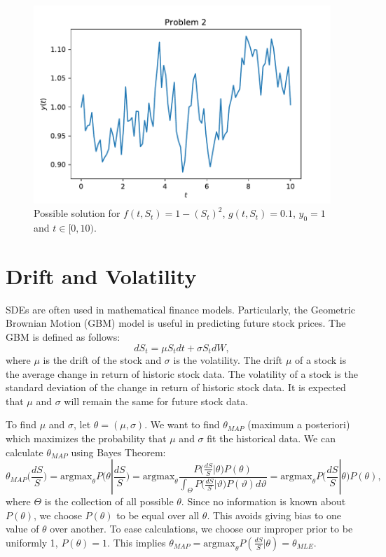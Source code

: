 \begin{figure}
\includegraphics[width=\textwidth]{figures/problem2.pdf}
\caption{Possible solution for $f(t,S_t)=1-(S_t)^2$, $g(t,S_t)=0.1$, $y_0=1$ and $t\in[0,10)$.}
\label{fig:prob2}
\end{figure}

\section*{Drift and Volatility}

SDEs are often used in mathematical finance models.
Particularly, the Geometric Brownian Motion (GBM) model is useful in predicting future stock prices.
The GBM is defined as follows:
\begin{equation}
dS_t=\mu S_tdt+\sigma S_tdW,
\label{eqn:gbm}
\end{equation}
where $\mu$ is the drift of the stock and $\sigma$ is the volatility.
The drift $\mu$ of a stock is the average change in return of historic stock data.
The volatility of a stock is the standard deviation of the change in return of historic stock data.
It is expected that $\mu$ and $\sigma$ will remain the same for future stock data.

To find $\mu$ and $\sigma$, let $\theta=(\mu,\sigma)$.
We want to find $\theta_{MAP}$ (maximum a posteriori) which maximizes the probability that $\mu$ and $\sigma$ fit the historical data.
We can calculate $\theta_{MAP}$ using Bayes Theorem:
\begin{equation}
\theta_{MAP}\Bigg(\frac{dS}{S}\Bigg)=\text{argmax}_\theta P\Bigg(\theta|\frac{dS}{S}\Bigg)=\text{argmax}_\theta\frac{P\Big(\frac{dS}{S}|\theta\Big)P(\theta)}{\int_\Theta P\Big(\frac{dS}{S}|\vartheta\Big)P(\vartheta)d\vartheta}=\text{argmax}_\theta P\Big(\frac{dS}{S}|\theta\Big)P(\theta),
\label{eqn:map}
\end{equation}
where $\Theta$ is the collection of all possible $\theta$.
Since no information is known about $P(\theta)$, we choose $P(\theta)$ to be equal over all $\theta$.
This avoids giving bias to one value of $\theta$ over another.
To ease calculations, we choose our improper prior to be uniformly 1, $P(\theta)=1$.
This implies $\theta_{MAP}=\text{argmax}_\theta P(\frac{dS}{S}|\theta)=\theta_{MLE}$.

